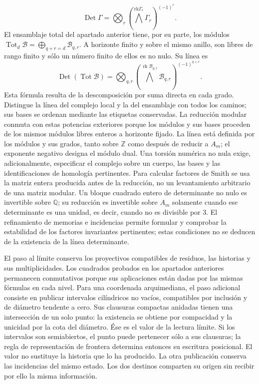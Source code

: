 \[
\operatorname{Det}\Gamma=
\bigotimes_r\left(\bigwedge^{\mathrm{rk}\Gamma_r}\Gamma_r\right)^{(-1)^r}.
\]
El ensamblaje total del apartado anterior tiene, por su parte, los módulos \(\operatorname{Tot}_d\mathcal B=\bigoplus_{q+r=d}\mathcal B_{q,r}\). A horizonte finito y sobre el mismo anillo, son libres de rango finito y sólo un número finito de ellos es no nulo. Su línea es
\[
\operatorname{Det}(\operatorname{Tot}\mathcal B)=
\bigotimes_{q,r}
\left(\bigwedge^{\operatorname{rk}\mathcal B_{q,r}}
\mathcal B_{q,r}\right)^{(-1)^{q+r}}.
\]
Esta fórmula resulta de la descomposición por suma directa en cada grado. Distingue la línea del complejo local y la del ensamblaje con todos los caminos; sus bases se ordenan mediante las etiquetas conservadas. La reducción modular conmuta con estas potencias exteriores porque los módulos y sus bases proceden de los mismos módulos libres enteros a horizonte fijado.
La línea está definida por los módulos y sus grados, tanto sobre \(\mathbb Z\) como después de reducir a \(A_m\); el exponente negativo designa el módulo dual. Una torsión numérica no nula exige, adicionalmente, especificar el complejo sobre un cuerpo, las bases y las identificaciones de homología pertinentes. Para calcular factores de Smith se usa la matriz entera producida antes de la reducción, no un levantamiento arbitrario de una matriz modular. Un bloque cuadrado entero de determinante no nulo es invertible sobre \(\mathbb Q\); su reducción es invertible sobre \(A_m\) solamente cuando ese determinante es una unidad, es decir, cuando no es divisible por \(3\). El refinamiento de memorias e incidencias permite formular y comprobar la estabilidad de los factores invariantes pertinentes; estas condiciones no se deducen de la existencia de la línea determinante.

El paso al límite conserva los proyectivos compatibles de residuos, las historias y sus multiplicidades. Los cuadrados probados en los apartados anteriores permanecen conmutativos porque sus aplicaciones están dadas por las mismas fórmulas en cada nivel. Para una coordenada arquimediana, el paso adicional consiste en publicar intervalos cilíndricos no vacíos, compatibles por inclusión y de diámetro tendente a cero. Sus clausuras compactas anidadas tienen una intersección de un solo punto: la existencia se obtiene por compacidad y la unicidad por la cota del diámetro. Ése es el valor de la lectura límite. Si los intervalos son semiabiertos, el punto puede pertenecer sólo a sus clausuras; la regla de representación de frontera determina entonces su escritura posicional. El valor no sustituye la historia que lo ha producido. La otra publicación conserva las incidencias del mismo estado. Los dos destinos comparten su origen sin recibir por ello la misma información.

